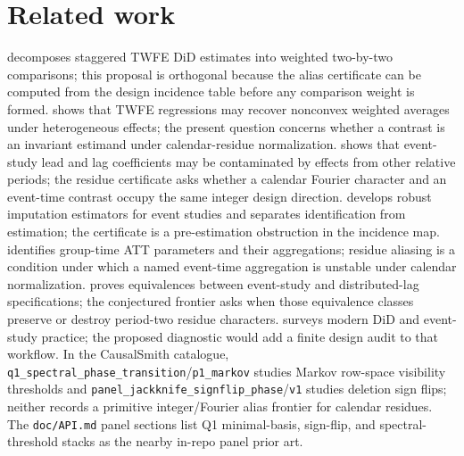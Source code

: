 \documentclass[11pt]{article}
\theoremstyle{definition}
\theoremstyle{plain}
\theoremstyle{remark}
\begin{document}
\section{Related work}
\citet{GoodmanBacon2021Timing} decomposes staggered TWFE DiD estimates into weighted two-by-two comparisons; this proposal is orthogonal because the alias certificate can be computed from the design incidence table before any comparison weight is formed. \citet{DeChaisemartinDHaultfoeuille2020TWFE} shows that TWFE regressions may recover nonconvex weighted averages under heterogeneous effects; the present question concerns whether a contrast is an invariant estimand under calendar-residue normalization. \citet{SunAbraham2021EventStudies} shows that event-study lead and lag coefficients may be contaminated by effects from other relative periods; the residue certificate asks whether a calendar Fourier character and an event-time contrast occupy the same integer design direction. \citet{BorusyakJaravelSpiess2024Revisiting} develops robust imputation estimators for event studies and separates identification from estimation; the certificate is a pre-estimation obstruction in the incidence map. \citet{CallawaySantAnna2021MultiplePeriods} identifies group-time ATT parameters and their aggregations; residue aliasing is a condition under which a named event-time aggregation is unstable under calendar normalization. \citet{SchmidheinySiegloch2023EventStudies} proves equivalences between event-study and distributed-lag specifications; the conjectured frontier asks when those equivalence classes preserve or destroy period-two residue characters. \citet{RothSantAnnaBilinskiPoe2023WhatsTrending} surveys modern DiD and event-study practice; the proposed diagnostic would add a finite design audit to that workflow. In the CausalSmith catalogue, \texttt{q1\_spectral\_phase\_transition}/\texttt{p1\_markov} studies Markov row-space visibility thresholds and \texttt{panel\_jackknife\_signflip\_phase}/\texttt{v1} studies deletion sign flips; neither records a primitive integer/Fourier alias frontier for calendar residues. The \texttt{doc/API.md} panel sections list Q1 minimal-basis, sign-flip, and spectral-threshold stacks as the nearby in-repo panel prior art.
\end{document}

